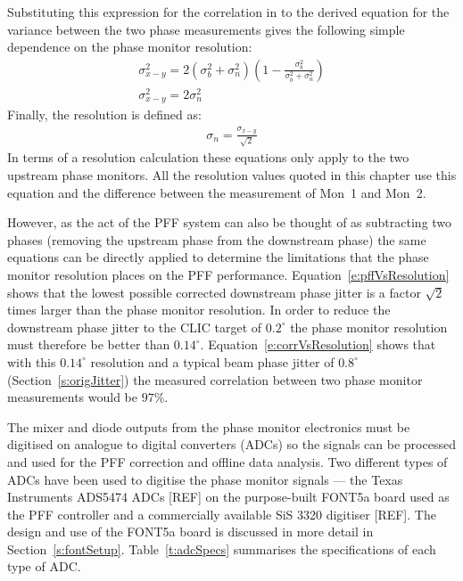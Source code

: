 Substituting this expression for the correlation in to the derived equation for the variance between the two phase measurements gives the following simple dependence on the phase monitor resolution:
\begin{equation}
\begin{gathered}
\sigma_{x-y}^2 = 2(\sigma_b^2 + \sigma_n^2)\left(1-\frac{\sigma_b^2}{\sigma_b^2 + \sigma_n^2}\right) \\
\sigma_{x-y}^2 = 2\sigma_n^2 \label{e:pffVsResolution}
\end{gathered}
\end{equation}
Finally, the resolution is defined as:
\begin{align}
\sigma_n = \frac{\sigma_{x-y}}{\sqrt{2}}
\label{e:resolutionEq}
\end{align}
In terms of a resolution calculation these equations only apply to the two upstream phase monitors. All the resolution values quoted in this chapter use this equation and the difference between the measurement of Mon~1 and Mon~2.

However, as the act of the PFF system can also be thought of as subtracting two phases (removing the upstream phase from the downstream phase) the same equations can be directly applied to determine the limitations that the phase monitor resolution places on the PFF performance. Equation~\ref{e:pffVsResolution} shows that the lowest possible corrected downstream phase jitter is a factor \(\sqrt{2}\) times larger than the phase monitor resolution. In order to reduce the downstream phase jitter to the CLIC target of \(0.2^\circ\) the phase monitor resolution must therefore be better than \(0.14^\circ\). Equation~\ref{e:corrVsResolution} shows that with this \(0.14^\circ\) resolution and a typical beam phase jitter of \(0.8^\circ\) (Section~\ref{s:origJitter}) the measured correlation between two phase monitor measurements would be \(97\%\).


The mixer and diode outputs from the phase monitor electronics must be digitised on analogue to digital converters (ADCs) so the signals can be processed and used for the PFF correction and offline data analysis. Two different types of ADCs have been used to digitise the phase monitor signals --- the Texas Instruments ADS5474 ADCs [REF] on the purpose-built FONT5a board used as the PFF controller and a commercially available SiS 3320 digitiser [REF]. The design and use of the FONT5a board is discussed in more detail in Section~\ref{s:fontSetup}. Table~\ref{t:adcSpecs} summarises the specifications of each type of ADC. 

